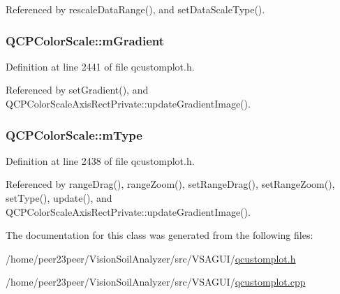 Referenced by rescale\+Data\+Range(), and set\+Data\+Scale\+Type().

\hypertarget{class_q_c_p_color_scale_ae195a385032066b5c46cc3301af58922}{}
\subsubsection[{m\+Gradient}]{ Q\+C\+P\+Color\+Scale\+::m\+Gradient\hspace{0.3cm}{\ttfamily [protected]}}\label{class_q_c_p_color_scale_ae195a385032066b5c46cc3301af58922}


Definition at line 2441 of file qcustomplot.\+h.



Referenced by set\+Gradient(), and Q\+C\+P\+Color\+Scale\+Axis\+Rect\+Private\+::update\+Gradient\+Image().

\hypertarget{class_q_c_p_color_scale_a7d47ed4ab76f38e50164e9d77fe33789}{}
\subsubsection[{m\+Type}]{ Q\+C\+P\+Color\+Scale\+::m\+Type\hspace{0.3cm}{\ttfamily [protected]}}\label{class_q_c_p_color_scale_a7d47ed4ab76f38e50164e9d77fe33789}


Definition at line 2438 of file qcustomplot.\+h.



Referenced by range\+Drag(), range\+Zoom(), set\+Range\+Drag(), set\+Range\+Zoom(), set\+Type(), update(), and Q\+C\+P\+Color\+Scale\+Axis\+Rect\+Private\+::update\+Gradient\+Image().



The documentation for this class was generated from the following files\+:\begin{DoxyCompactItemize}
\item 
/home/peer23peer/\+Vision\+Soil\+Analyzer/src/\+V\+S\+A\+G\+U\+I/\hyperlink{qcustomplot_8h}{qcustomplot.\+h}\item 
/home/peer23peer/\+Vision\+Soil\+Analyzer/src/\+V\+S\+A\+G\+U\+I/\hyperlink{qcustomplot_8cpp}{qcustomplot.\+cpp}\end{DoxyCompactItemize}
